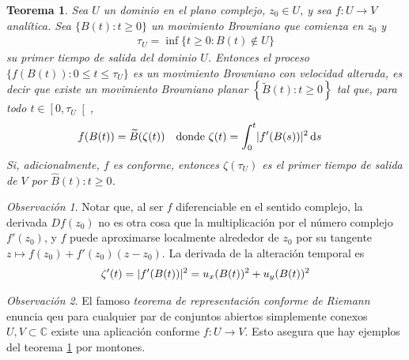 \documentclass{report}
\newcommand{\brownian}{B}
\newcommand{\alteredBrownian}{\widetilde{\brownian}}
\newcommand{\dd}{\mathop{}\!\mathrm{d}}
\newcommand{\complexNumbers}{\mathbb{C}}
\DeclarePairedDelimiter{\abs}{\lvert}{\rvert}
\theoremstyle{plain}
\newtheorem{theorem}{Teorema}
\theoremstyle{remark}
\newtheorem{remark}{Observación}
\theoremstyle{definition}
\begin{document}
\begin{theorem}
  \label{theorem:ConformalInvarianceOfPlanarBrownianMotion}
  Sea \(U\) un dominio en el plano complejo, \(z_0 \in U\), y sea \(f : U \rightarrow V\) analítica.
  Sea \(\{\brownian(t) : t \geq 0\}\) un movimiento Browniano que comienza en \(z_0\) y
  \begin{align}
    \tau_U
    =
    \inf \{ t \geq 0 : \brownian(t) \notin U\}
  \end{align}
  su primer tiempo de salida del dominio \(U\).
  Entonces el proceso
  \(\{f(\brownian(t)) : 0 \leq t \leq \tau_U\}\)  %
  es un movimiento Browniano con velocidad alterada, es decir que existe un movimiento Browniano planar \(\left\{ \alteredBrownian(t) : t \geq 0 \right\}\) tal que, para todo \(t \in \left[ 0, \tau_U \right[\),
  \begin{align}
    & f(\brownian(t)) = \alteredBrownian(\zeta(t))
    &
    & \text{donde }
    \zeta(t) = \int_0^t \abs{f'(\brownian(s))}^2 \dd s
  \end{align}
  Si, adicionalmente, \(f\) es conforme, entonces \(\zeta(\tau_U)\) es el primer tiempo de salida de \(V\) por \(\widehat{B}(t) : t \geq 0\).
\end{theorem}
\begin{remark}
  Notar que, al ser \(f\) diferenciable en el sentido complejo, la derivada \(Df(z_0)\) no es otra cosa que la multiplicación por el número complejo \(f'(z_0)\), y \(f\) puede aproximarse localmente alrededor de \(z_0\) por su tangente \(z \mapsto f(z_0) + f'(z_0)(z - z_0)\).
  La derivada de la alteración temporal es
  \begin{align}
    \zeta'(t)
    =
    \abs{f'(\brownian(t))}^2
    =
    u_x(\brownian(t))^2 + u_y(\brownian(t))^2
  \end{align}
\end{remark}
\begin{remark}
  El famoso \emph{teorema de representación conforme de Riemann} enuncia qeu para cualquier par de conjuntos abiertos simplemente conexos \(U, V \subset \complexNumbers\) existe una aplicación conforme \(f : U \rightarrow V\).
  Esto asegura que hay ejemplos del teorema \ref{theorem:ConformalInvarianceOfPlanarBrownianMotion} por montones.
\end{remark}
\end{document}
